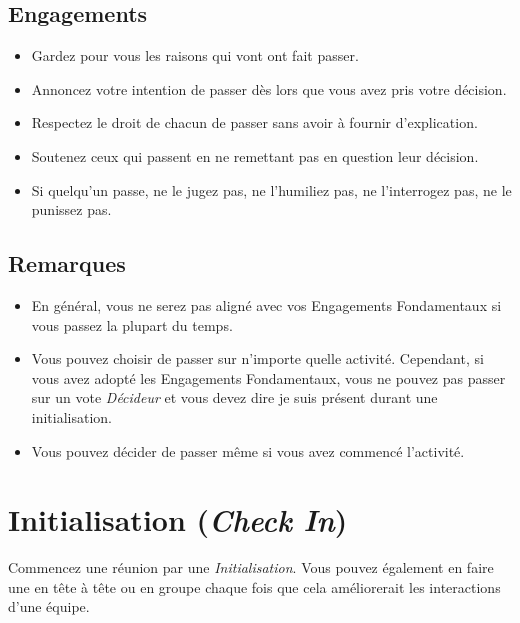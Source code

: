 \documentclass[11pt]{book}
\let\oldsection\section
\renewcommand\section{\clearpage\oldsection}
\begin{document}
\subsection{Engagements}
\begin{itemize}
	\item Gardez pour vous les raisons qui vont ont fait passer.
	\item Annoncez votre intention de passer dès lors que vous avez pris votre décision.
	\item Respectez le droit de chacun de passer sans avoir à fournir d'explication.
	\item Soutenez ceux qui passent en ne remettant pas en question leur décision.
	\item Si quelqu'un passe, ne le jugez pas, ne l'humiliez pas, ne l'interrogez pas, ne le punissez pas.
\end{itemize}

\subsection{Remarques}
\begin{itemize}
	\item En général, vous ne serez pas aligné avec vos Engagements Fondamentaux si vous passez la plupart du temps.
	\item Vous pouvez choisir de passer sur n'importe quelle activité. Cependant, si vous avez adopté les Engagements
	      Fondamentaux, vous ne pouvez pas passer sur un vote \emph{Décideur} et vous devez dire \og{}je suis présent\fg{}
	      durant une initialisation.
	\item Vous pouvez décider de passer même si vous avez commencé l'activité.
\end{itemize}

\section{Initialisation (\emph{Check In})} \label{initialisation}

Commencez une réunion par une \emph{Initialisation}. Vous pouvez également en faire une en tête à tête ou en groupe chaque fois que
cela améliorerait les interactions d'une équipe.
\end{document}
